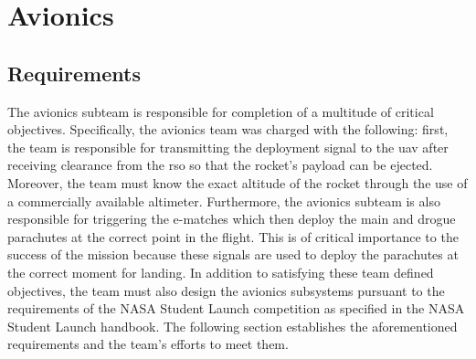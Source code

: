 \chapter{Avionics}
\section{Requirements}
The avionics subteam is responsible for completion of a multitude of critical objectives. Specifically, the avionics team was charged with the following: first, the team is responsible for transmitting the deployment signal to the \gls{uav} after receiving clearance from the \gls{rso} so that the rocket’s payload can be ejected. Moreover, the team must know the exact altitude of the rocket through the use of a commercially available altimeter.
Furthermore, the avionics subteam is also responsible for triggering the e-matches which then deploy the main and drogue parachutes
at the correct point in the flight. This is of critical importance to the success of the mission because these signals are used to deploy the parachutes at the correct moment for landing.
In addition to satisfying these team defined objectives, the team must also design the avionics subsystems pursuant to the requirements of the NASA Student Launch competition as specified in the NASA Student Launch handbook. The following section establishes the aforementioned requirements and the team’s efforts to meet them. 

